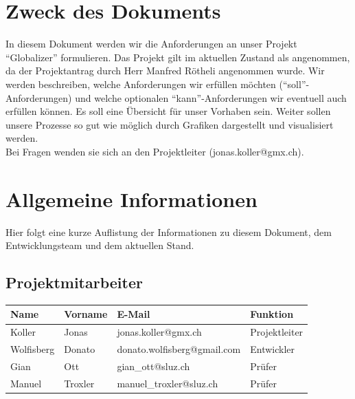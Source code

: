 \documentclass[12pt]{article}
\begin{document}
  \section{Zweck des Dokuments}
    In diesem Dokument werden wir die Anforderungen an unser Projekt “Globalizer” formulieren. Das Projekt gilt im aktuellen Zustand als angenommen, da der Projekt\-antrag durch Herr Manfred Rötheli angenommen wurde. Wir werden beschreiben, welche Anforderungen wir erfüllen möchten (“soll”-Anforderungen) und welche optionalen “kann”-Anforderungen wir eventuell auch erfüllen können. Es soll eine Übersicht für unser Vorhaben sein. Weiter sollen unsere Prozesse so gut wie möglich durch Grafiken dargestellt und visualisiert werden. \\
    Bei Fragen wenden sie sich an den Projektleiter (jonas.koller@gmx.ch).

  \section{Allgemeine Informationen}
    Hier folgt eine kurze Auflistung der Informationen zu diesem Dokument, dem Ent\-wicklungsteam und dem aktuellen Stand.

  \subsection{Projektmitarbeiter}
    \begin{table}[h]
      \begin{tabularx}{\textwidth}{|l|l|X|l|}
        \hline
        \textbf{Name} & \textbf{Vorname}  & \textbf{E-Mail}                & \textbf{Funktion}     \\ \hline
        Koller        & Jonas             & jonas.koller@gmx.ch            & Projektleiter         \\ \hline
        Wolfisberg    & Donato            & donato.wolfisberg@gmail.com    & Entwickler            \\ \hline
        Gian          & Ott               & gian\_ott@sluz.ch              & Prüfer                \\ \hline
        Manuel        & Troxler           & manuel\_troxler@sluz.ch        & Prüfer                \\ \hline
      \end{tabularx}%
    \end{table}
\end{document}
